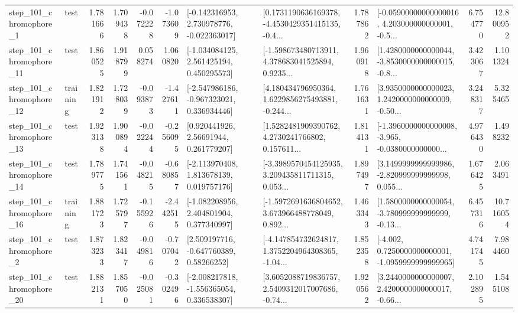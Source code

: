 \begin{tabular}{llrrrrllrlrr}
   step\_101\_chromophore\_1 &      test &      1.781666 &    1.709438 &     -0.072228 & -1.073609 &   [-0.142316953, 2.730978776, -0.022363017] &  [0.1731190636169378, -4.4530429351415135, -0.4... &       1.787862 &  [-0.05900000000000016, 4.203000000000001, -0.5... &            6.754770 &         12.800952 \\
  step\_101\_chromophore\_11 &      test &      1.860525 &    1.918799 &      0.058274 &  1.060820 &    [-1.034084125, 2.561425194, 0.450295573] &  [-1.598673480713911, 4.378683041525894, 0.9235... &       1.960918 &  [1.4280000000000044, -3.8530000000000015, -0.8... &            3.423067 &          1.101324 \\
  step\_101\_chromophore\_12 &  training &      1.821912 &    1.728039 &     -0.093873 & -1.427611 &   [-2.547986186, -0.967323021, 0.336934446] &  [4.180434796950364, 1.6229856275493881, -0.244... &       1.761631 &  [3.9350000000000023, 1.2420000000000009, -0.50... &            3.248317 &          5.325465 \\
  step\_101\_chromophore\_13 &      test &      1.923138 &    1.900894 &     -0.022244 & -0.256095 &      [0.920441926, 2.56691944, 0.261779207] &  [1.5282481909390762, 4.2730241766802, 0.157611... &       1.814131 &  [-1.3960000000000008, -3.965, -0.0380000000000... &            4.976430 &          1.498232 \\
  step\_101\_chromophore\_14 &      test &      1.789775 &    1.741561 &     -0.048215 & -0.680857 &    [-2.113970408, 1.813678139, 0.019757176] &  [-3.3989570454125935, 3.209435811711315, 0.053... &       1.897497 &  [3.1499999999999986, -2.820999999999998, 0.055... &            1.676425 &          2.063491 \\
  step\_101\_chromophore\_16 &  training &      1.881723 &    1.725797 &     -0.155926 & -2.442515 &    [-1.082208956, 2.404801904, 0.377340997] &  [-1.5972691636804652, 3.673966488778049, 0.892... &       1.463343 &  [1.5800000000000054, -3.780999999999999, -0.13... &            6.457316 &         10.716054 \\
   step\_101\_chromophore\_2 &      test &      1.873233 &    1.823417 &     -0.049816 & -0.707042 &     [2.509197716, -0.647760389, 0.58266252] &  [-4.147854732624817, 1.3752204964308365, -1.04... &       1.852358 &  [-4.002, 0.7250000000000001, -1.0959999999999965] &            4.741745 &          7.984460 \\
  step\_101\_chromophore\_20 &      test &      1.882131 &    1.857050 &     -0.025081 & -0.302496 &   [-2.008217818, -1.556365054, 0.336538307] &  [3.6052088719836757, 2.5409312017007686, -0.74... &       1.920562 &  [3.2440000000000007, 2.4200000000000017, -0.66... &            2.102895 &          1.545108 \\

\end{tabular}

